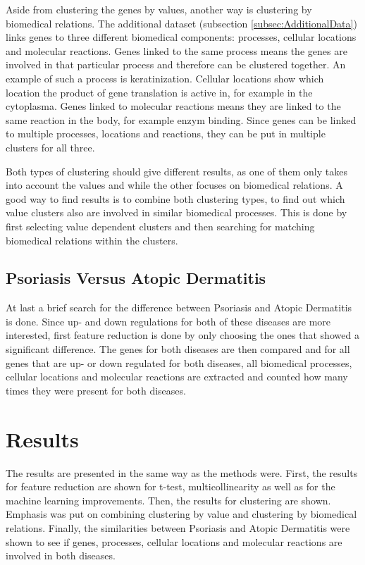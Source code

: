 \documentclass[10pt,a4paper]{article}
\begin{document}
	Aside from clustering the genes by values, another way is clustering by biomedical relations. The additional dataset (subsection \ref{subsec:AdditionalData}) links genes to three different biomedical components: processes, cellular locations and molecular reactions. Genes linked to the same process means the genes are involved in that particular process and therefore can be clustered together. An example of such a process is keratinization. Cellular locations show which location the product of gene translation is active in, for example in the cytoplasma. Genes linked to molecular reactions means they are linked to the same reaction in the body, for example enzym binding. Since genes can be linked to multiple processes, locations and reactions, they can be put in multiple clusters for all three.
	
	Both types of clustering should give different results, as one of them only takes into account the values and while the other focuses on biomedical relations. A good way to find results is to combine both clustering types, to find out which value clusters also are involved in similar biomedical processes. This is done by first selecting value dependent clusters and then searching for matching biomedical relations within the clusters.
	
	\subsection{Psoriasis Versus Atopic Dermatitis}
	\label{subsec:MethodsPsoriasisVersusAtopicDermatitis}
	
	At last a brief search for the difference between Psoriasis and Atopic Dermatitis is done. Since up- and down regulations for both of these diseases are more interested, first feature reduction is done by only choosing the ones that showed a significant difference. The genes for both diseases are then compared and for all genes that are up- or down regulated for both diseases, all biomedical processes, cellular locations and molecular reactions are extracted and counted how many times they were present for both diseases. 
	
	\section{Results}
	\label{sec:Results}
	
	The results are presented in the same way as the methods were. First, the results for feature reduction are shown for t-test, multicollinearity as well as for the machine learning improvements. Then, the results for clustering are shown. Emphasis was put on combining clustering by value and clustering by biomedical relations. Finally, the similarities between Psoriasis and Atopic Dermatitis were shown to see if genes, processes, cellular locations and molecular reactions are involved in both diseases. 
	
\end{document}
